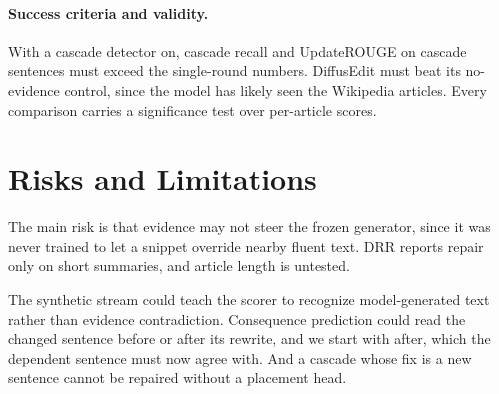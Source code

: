 \documentclass[11pt]{article}
\begin{document}
\paragraph{Success criteria and validity.}
With a cascade detector on, cascade recall and UpdateROUGE on cascade sentences must exceed the single-round numbers. DiffusEdit must beat its no-evidence control, since the model has likely seen the Wikipedia articles. Every comparison carries a significance test over per-article scores.

\section{Risks and Limitations}
\label{sec:risks}

The main risk is that evidence may not steer the frozen generator, since it was never trained to let a snippet override nearby fluent text. DRR reports repair only on short summaries, and article length is untested.

The synthetic stream could teach the scorer to recognize model-generated text rather than evidence contradiction. Consequence prediction could read the changed sentence before or after its rewrite, and we start with after, which the dependent sentence must now agree with. And a cascade whose fix is a new sentence cannot be repaired without a placement head.


\end{document}
